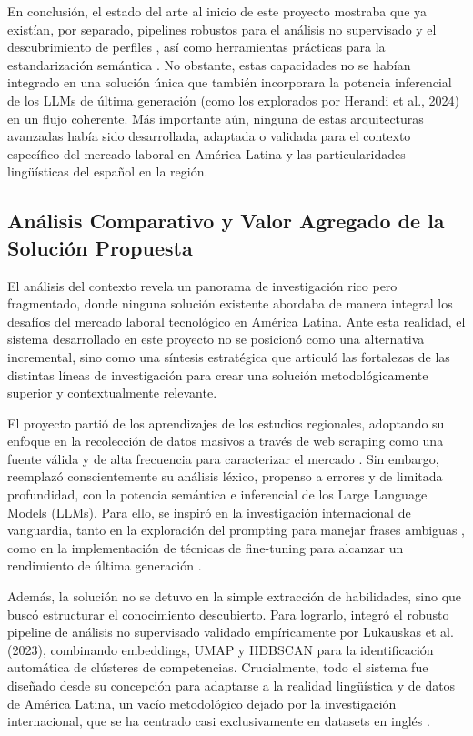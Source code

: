 En conclusión, el estado del arte al inicio de este proyecto mostraba que ya existían, por separado, pipelines robustos para el análisis no supervisado y el descubrimiento de perfiles \parencite{lukauskas2023}, así como herramientas prácticas para la estandarización semántica \parencite{kavargyris2025}. No obstante, estas capacidades no se habían integrado en una solución única que también incorporara la potencia inferencial de los LLMs de última generación (como los explorados por Herandi et al., 2024) en un flujo coherente. Más importante aún, ninguna de estas arquitecturas avanzadas había sido desarrollada, adaptada o validada para el contexto específico del mercado laboral en América Latina y las particularidades lingüísticas del español en la región.

\subsection{Análisis Comparativo y Valor Agregado de la Solución Propuesta}

El análisis del contexto revela un panorama de investigación rico pero fragmentado, donde ninguna solución existente abordaba de manera integral los desafíos del mercado laboral tecnológico en América Latina. Ante esta realidad, el sistema desarrollado en este proyecto no se posicionó como una alternativa incremental, sino como una síntesis estratégica que articuló las fortalezas de las distintas líneas de investigación para crear una solución metodológicamente superior y contextualmente relevante.

El proyecto partió de los aprendizajes de los estudios regionales, adoptando su enfoque en la recolección de datos masivos a través de web scraping como una fuente válida y de alta frecuencia para caracterizar el mercado \parencite{aguilera2018, martinez2024, rubio2024}. Sin embargo, reemplazó conscientemente su análisis léxico, propenso a errores y de limitada profundidad, con la potencia semántica e inferencial de los Large Language Models (LLMs). Para ello, se inspiró en la investigación internacional de vanguardia, tanto en la exploración del prompting para manejar frases ambiguas \parencite{nguyen2024}, como en la implementación de técnicas de fine-tuning para alcanzar un rendimiento de última generación \parencite{herandi2024}.

Además, la solución no se detuvo en la simple extracción de habilidades, sino que buscó estructurar el conocimiento descubierto. Para lograrlo, integró el robusto pipeline de análisis no supervisado validado empíricamente por Lukauskas et al. (2023), combinando embeddings, UMAP y HDBSCAN para la identificación automática de clústeres de competencias. Crucialmente, todo el sistema fue diseñado desde su concepción para adaptarse a la realidad lingüística y de datos de América Latina, un vacío metodológico dejado por la investigación internacional, que se ha centrado casi exclusivamente en datasets en inglés \parencite{herandi2024}.

